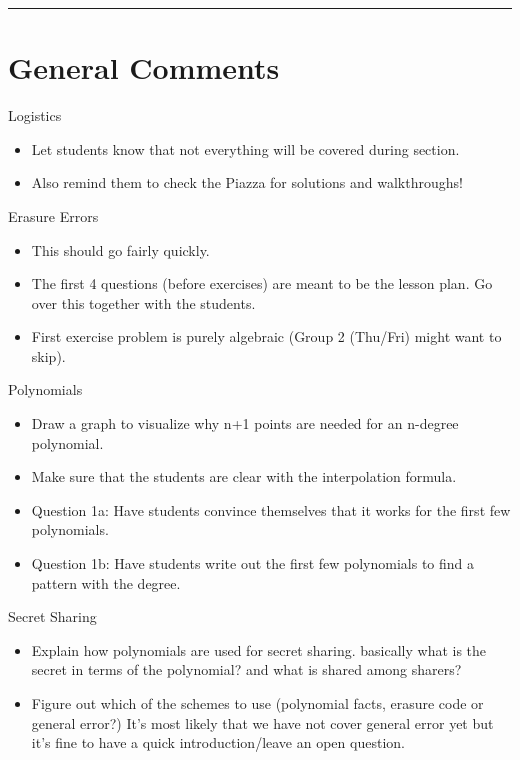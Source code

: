 \documentclass{exam}
\title{}
\date{Polynomials, Secret Sharing, Erasure Errors, General Errors, Self Reference}
\begin{document}
\maketitle
\rule{\textwidth}{0.15em}
\fontsize{12}{15}\selectfont
\thispagestyle{empty}


\section{General Comments}
\begin{questions}
\item Logistics
\begin{itemize}
\item Let students know that not everything will be covered during section. 
\item Also remind them to check the Piazza for solutions and walkthroughs!
\end{itemize}

\item Erasure Errors
\begin{itemize}
\item This should go fairly quickly.
\item The first 4 questions (before exercises) are meant to be the lesson plan. Go over this together with the students.
\item First exercise problem is purely algebraic (Group 2 (Thu/Fri) might want to skip).
\end{itemize}

\item Polynomials
\begin{itemize}
\item Draw a graph to visualize why n+1 points are needed for an n-degree polynomial.
\item Make sure that the students are clear with the interpolation formula.
\item Question 1a: Have students convince themselves that it works for the first few polynomials.
\item Question 1b: Have students write out the first few polynomials to find a pattern with the degree.
\end{itemize}

\item Secret Sharing
\begin{itemize}
\item Explain how polynomials are used for secret sharing. basically what is the secret in terms of the polynomial? and what is shared among sharers?
\item Figure out which of the schemes to use (polynomial facts, erasure code or general error?) It's most likely that we have not cover general error yet but it's fine to have a quick introduction/leave an open question.
\end{itemize}
\end{questions}
\end{document}
